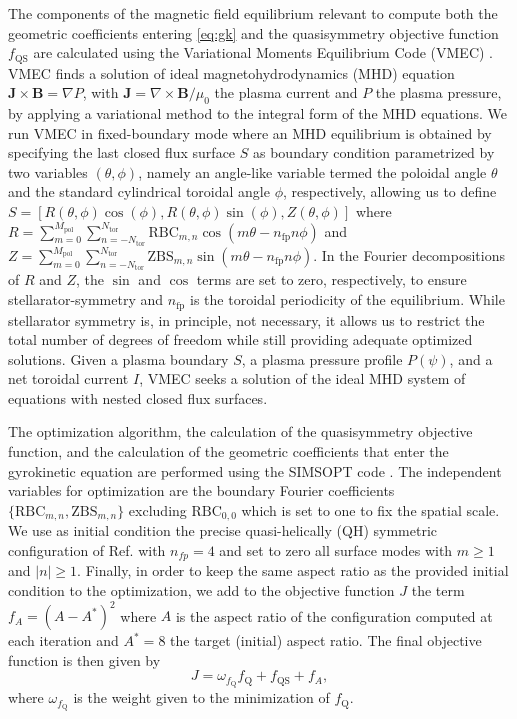 \documentclass[prl,twocolumn,amsmath,amssymb,showpacs,superscriptaddress]{revtex4-2}
\begin{document}
The components of the magnetic field equilibrium relevant to compute both the geometric coefficients entering \cref{eq:gk} and the quasisymmetry objective function $f_{\text{QS}}$ are calculated using the Variational Moments Equilibrium Code (VMEC) \cite{Hirshman1983}.
%
VMEC finds a solution of ideal magnetohydrodynamics (MHD) equation $\mathbf J \times \mathbf B = \nabla P$, with $\mathbf J = \nabla \times \mathbf B/\mu_0$ the plasma current and $P$ the plasma pressure, by applying a variational method to the integral form of the MHD equations.
%
We run VMEC in fixed-boundary mode where an MHD equilibrium is obtained by specifying the last closed flux surface $S$ as boundary condition parametrized by two variables $(\theta,\phi)$, namely an angle-like variable termed the poloidal angle $\theta$ and the standard cylindrical toroidal angle $\phi$, respectively, allowing us to define $S=[R(\theta,\phi)\cos(\phi), R(\theta,\phi)\sin(\phi), Z(\theta,\phi)]$ where $R=\sum_{m=0}^{M_{\mathrm{pol}}}\sum_{n=-N_{\mathrm{tor}}}^{N_{\mathrm{tor}}}\mathrm{RBC}_{m,n}\cos(m\theta-n_{\text{fp}}n\phi)$ and $Z=\sum_{m=0}^{M_{\mathrm{pol}}}\sum_{n=-N_{\mathrm{tor}}}^{N_{\mathrm{tor}}}\mathrm{ZBS}_{m,n}\sin(m\theta-n_{\text{fp}}n\phi)$.
%
In the Fourier decompositions of $R$ and $Z$, the $\sin$ and $\cos$ terms are set to zero, respectively, to ensure stellarator-symmetry \cite{Dewar1998} and $n_{\text{fp}}$ is the toroidal periodicity of the equilibrium.
%
While stellarator symmetry is, in principle, not necessary, it allows us to restrict the total number of degrees of freedom while still providing adequate optimized solutions.
%
Given a plasma boundary $S$, a plasma pressure profile $P(\psi)$, and a net toroidal current $I$, VMEC seeks a solution of the ideal MHD system of equations with nested closed flux surfaces.

The optimization algorithm, the calculation of the quasisymmetry objective function, and the calculation of the geometric coefficients that enter the gyrokinetic equation are performed using the SIMSOPT code \cite{Landreman2021b}.
%
The independent variables for optimization are the boundary Fourier coefficients $\{\mathrm{RBC}_{m,n},\mathrm{ZBS}_{m,n}\}$ excluding $\mathrm{RBC}_{0,0}$ which is set to one to fix the spatial scale.
%
We use as initial condition the precise quasi-helically (QH) symmetric configuration of Ref. \cite{Landreman2022} with $n_{fp}=4$ and set to zero all surface modes with {$m\ge1$ and $|n|\ge1$}.
%
Finally, in order to keep the same aspect ratio as the provided initial condition to the optimization, we add to the objective function $J$ the term $f_A=(A-A^{*})^2$ where $A$ is the aspect ratio of the configuration computed at each iteration and $A^{*}=8$ the target (initial) aspect ratio.
%
The final objective function is then given by
%
\begin{equation}
    J=\omega_{f_{\text{Q}}} f_{\text{Q}}+f_{\text{QS}}+f_A,
\end{equation}
%
where $\omega_{f_{\text{Q}}}$ is the weight given to the minimization of $f_{\text{Q}}$.
\end{document}
